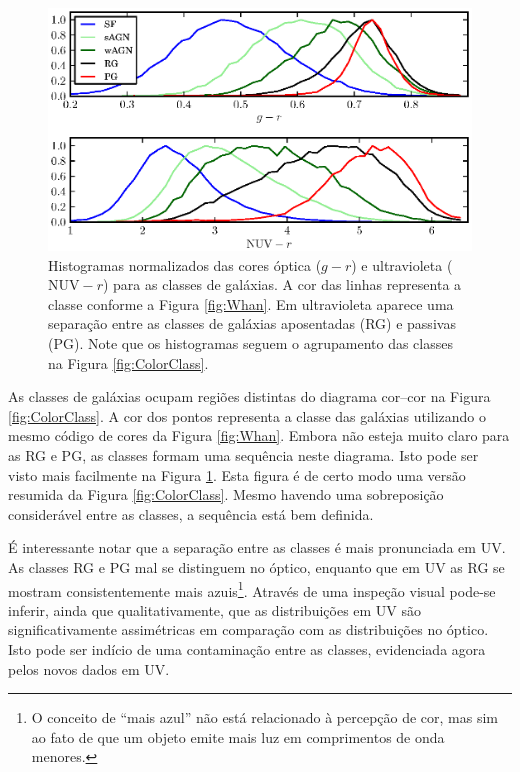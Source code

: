 \begin{figure}
	\includegraphics{figuras/histo_galtype_color.eps}
	\caption[Histogramas de cores para as classes de galáxias.]
	{Histogramas normalizados das cores óptica ($g-r$) e ultravioleta
	($\mathrm{NUV}-r$) para as classes de galáxias. A cor das linhas representa a
	classe conforme a Figura \ref{fig:Whan}. Em ultravioleta aparece uma separação
	entre as classes de galáxias aposentadas (RG) e passivas (PG). Note que os
	histogramas seguem o agrupamento das classes na Figura
	\ref{fig:ColorClass}.}
	\label{fig:HistogramaCorClasse}
\end{figure}

As classes de galáxias ocupam regiões distintas do diagrama cor--cor na Figura
\ref{fig:ColorClass}. A cor dos pontos representa a classe das galáxias
utilizando o mesmo código de cores da Figura \ref{fig:Whan}. Embora não esteja
muito claro para as RG e PG, as classes formam uma sequência neste diagrama.
Isto pode ser visto mais facilmente na Figura \ref{fig:HistogramaCorClasse}.
Esta figura é de certo modo uma versão resumida da Figura \ref{fig:ColorClass}.
Mesmo havendo uma sobreposição considerável entre as classes, a sequência está
bem definida.

É interessante notar que a separação entre as classes é mais pronunciada em UV.
As classes RG e PG mal se distinguem no óptico, enquanto que em UV as RG se
mostram consistentemente mais azuis\footnote{O conceito de ``mais azul'' não
está relacionado à percepção de cor, mas sim ao fato de que um objeto emite mais
luz em comprimentos de onda menores.}. Através de uma inspeção visual pode-se
inferir, ainda que qualitativamente, que as distribuições em UV são
significativamente assimétricas em comparação com as distribuições no óptico.
Isto pode ser indício de uma contaminação entre as classes, evidenciada agora
pelos novos dados em UV.

